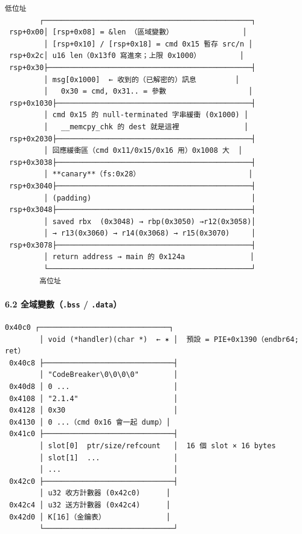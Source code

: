 \documentclass[10pt,a4paper]{article}
\begin{document}
\begin{Verbatim}[breaklines=true,breakanywhere=true,breakautoindent=false,fontsize=\fontsize{7.0}{9.5}\selectfont]
        低位址
        ┌────────────────────────────────────────────────┐
 rsp+0x00│ [rsp+0x08] = &len （區域變數）                │
         │ [rsp+0x10] / [rsp+0x18] = cmd 0x15 暫存 src/n │
 rsp+0x2c│ u16 len（0x13f0 寫進來；上限 0x1000）         │
 rsp+0x30├───────────────────────────────────────────────┤
         │ msg[0x1000]  ← 收到的（已解密的）訊息         │
         │   0x30 = cmd, 0x31.. = 參數                   │
 rsp+0x1030├─────────────────────────────────────────────┤
         │ cmd 0x15 的 null-terminated 字串緩衝 (0x1000) │
         │   __memcpy_chk 的 dest 就是這裡               │
 rsp+0x2030├─────────────────────────────────────────────┤
         │ 回應緩衝區（cmd 0x11/0x15/0x16 用）0x1008 大  │
 rsp+0x3038├─────────────────────────────────────────────┤
         │ **canary**（fs:0x28）                         │
 rsp+0x3040├─────────────────────────────────────────────┤
         │ (padding)                                     │
 rsp+0x3048├─────────────────────────────────────────────┤
         │ saved rbx  (0x3048) → rbp(0x3050) →r12(0x3058)│
         │ → r13(0x3060) → r14(0x3068) → r15(0x3070)     │
 rsp+0x3078├─────────────────────────────────────────────┤
         │ return address → main 的 0x124a               │
         └───────────────────────────────────────────────┘
        高位址
\end{Verbatim}

\paragraph{\texorpdfstring{6.2 全域變數（\texttt{.\allowbreak{}bss} /
\texttt{.\allowbreak{}data}）}{6.2 全域變數（.bss / .data）}}\label{ux5168ux57dfux8b8aux6578.bss-.data}

\begin{Verbatim}[breaklines=true,breakanywhere=true,breakautoindent=false,fontsize=\fontsize{7.0}{9.5}\selectfont]
 0x40c0 ┌──────────────────────────────┐
        │ void (*handler)(char *)  ← ✶ │  預設 = PIE+0x1390（endbr64; ret）
 0x40c8 ├──────────────────────────────┤
        │ "CodeBreaker\0\0\0\0"        │
 0x40d8 │ 0 ...                        │
 0x4108 │ "2.1.4"                      │
 0x4128 │ 0x30                         │
 0x4130 │ 0 ...（cmd 0x16 會一起 dump）│
 0x41c0 ├──────────────────────────────┤
        │ slot[0]  ptr/size/refcount   │  16 個 slot × 16 bytes
        │ slot[1]  ...                 │
        │ ...                          │
 0x42c0 ├──────────────────────────────┤
        │ u32 收方計數器 (0x42c0)      │
 0x42c4 │ u32 送方計數器 (0x42c4)      │
 0x42d0 │ K[16]（金鑰表）              │
        └──────────────────────────────┘
\end{Verbatim}
\end{document}
